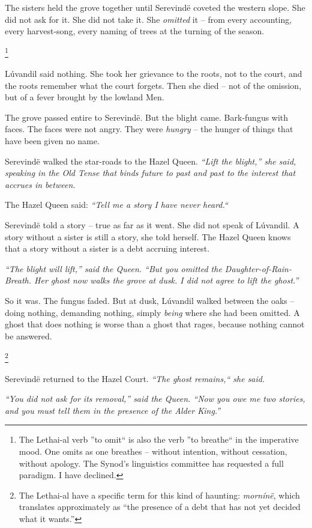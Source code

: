 \documentclass[12pt]{article}
\begin{document}
The sisters held the grove together until Serevindë coveted the western slope. She did not ask for it. She did not take it. She \textit{omitted} it -- from every accounting, every harvest-song, every naming of trees at the turning of the season.

\footnote{The Lethai-al verb ''to omit`` is also the verb ''to breathe`` in the imperative mood. One omits as one breathes -- without intention, without cessation, without apology. The Synod's linguistics committee has requested a full paradigm. I have declined.}

Lúvandil said nothing. She took her grievance to the roots, not to the court, and the roots remember what the court forgets. Then she died -- not of the omission, but of a fever brought by the lowland Men.

The grove passed entire to Serevindë. But the blight came. Bark-fungus with faces. The faces were not angry. They were \textit{hungry} -- the hunger of things that have been given no name.

Serevindë walked the star-roads to the Hazel Queen. \textit{``Lift the blight,'' she said, speaking in the Old Tense that binds future to past and past to the interest that accrues in between.}

The Hazel Queen said: \textit{``Tell me a story I have never heard.``}

Serevindë told a story -- true as far as it went. She did not speak of Lúvandil. A story without a sister is still a story, she told herself. The Hazel Queen knows that a story without a sister is a debt accruing interest.

\textit{``The blight will lift,'' said the Queen. ``But you omitted the Daughter-of-Rain-Breath. Her ghost now walks the grove at dusk. I did not agree to lift the ghost.''}

So it was. The fungus faded. But at dusk, Lúvandil walked between the oaks -- doing nothing, demanding nothing, simply \textit{being} where she had been omitted. A ghost that does nothing is worse than a ghost that rages, because nothing cannot be answered.

\footnote{The Lethai-al have a specific term for this kind of haunting: \textit{mornínë}, which translates approximately as ``the presence of a debt that has not yet decided what it wants.''}

Serevindë returned to the Hazel Court. \textit{``The ghost remains,`` she said.}

\textit{``You did not ask for its removal,'' said the Queen. ``Now you owe me two stories, and you must tell them in the presence of the Alder King.''}
\end{document}
